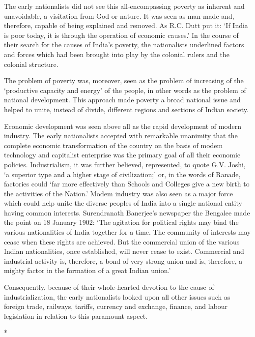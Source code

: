 \begin{multicols}{2}
The early nationalists did not see this all-encompassing poverty as inherent and unavoidable, a visitation from God or nature. It was seen as man-made and, therefore, capable of being explained and removed. As R.C. Dutt put it: `If India is poor today, it is through the operation of economic causes.' In the course of their search for the causes of India's poverty, the nationalists underlined factors and forces which had been brought into play by the colonial rulers and the colonial structure.

The problem of poverty was, moreover, seen as the problem of increasing of the `productive capacity and energy' of the people, in other words as the problem of national development. This approach made poverty a broad national issue and helped to unite, instead of divide, different regions and sections of Indian society.

Economic development was seen above all as the rapid development of modern industry. The early nationalists accepted with remarkable unanimity that the complete economic transformation of the country on the basis of modem technology and capitalist enterprise was the primary goal of all their economic policies. Industrialism, it was further believed, represented, to quote G.V. Joshi, `a superior type and a higher stage of civilization;' or, in the words of Ranade, factories could `far more effectively than Schools and Colleges give a new birth to the activities of the Nation.' Modem industry was also seen as a major force which could help unite the diverse peoples of India into a single national entity having common interests. Surendranath Banerjee's newspaper the Bengalee made the point on 18 January 1902: `The agitation for political rights may bind the various nationalities of India together for a time. The community of interests may cease when these rights are achieved. But the commercial union of the various Indian nationalities, once established, will never cease to exist. Commercial and industrial activity is, therefore, a bond of very strong union and is, therefore, a mighty factor in the formation of a great Indian union.'

Consequently, because of their whole-hearted devotion to the cause of industrialization, the early nationalists looked upon all other issues such as foreign trade, railways, tariffs, currency and exchange, finance, and labour legislation in relation to this paramount aspect.

\begin{center}*\end{center}


\end{multicols}
